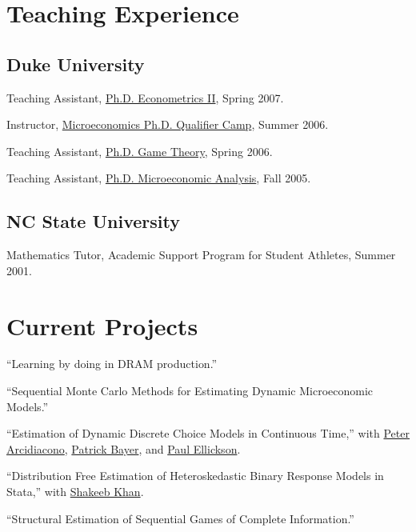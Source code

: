 \documentclass[letterpaper]{article}
\renewenvironment{itemize}{
  \begin{list}{}
    { \setlength{\itemsep}{5pt}
      \setlength{\parsep}{0pt}
      \setlength{\topsep}{0pt}
      \setlength{\leftmargin}{0em} } }{
  \end{list}}
\begin{document}
\section*{Teaching Experience}

\subsection*{Duke University}

\begin{itemize}
\item Teaching Assistant,
  \href{http://jblevins.org/courses/econ342s07}{Ph.D. Econometrics II},
  Spring 2007.
\item Instructor,
  \href{http://jblevins.org/courses/qualcamp06}{Microeconomics Ph.D. Qualifier Camp},
  Summer 2006.
\item Teaching Assistant,
  \href{http://jblevins.org/courses/econ302s06}{Ph.D. Game Theory},
  Spring 2006.
\item Teaching Assistant,
  \href{http://jblevins.org/courses/econ301f05}{Ph.D. Microeconomic Analysis},
  Fall 2005.
\end{itemize}

\subsection*{NC State University}

\begin{itemize}
\item Mathematics Tutor, Academic Support Program for Student Athletes,
  Summer 2001.
\end{itemize}


\section*{Current Projects}

\begin{itemize}
\item ``Learning by doing in DRAM production.''
\item ``Sequential Monte Carlo Methods for Estimating Dynamic
  Microeconomic Models.''
\item ``Estimation of Dynamic Discrete Choice Models in Continuous
  Time,'' with
  \href{http://www.econ.duke.edu/~psarcidi/}{Peter Arcidiacono},
  \href{http://www.econ.duke.edu/~pb29/}{Patrick Bayer}, and
  \href{http://www.econ.duke.edu/~paule/}{Paul Ellickson}.
\item ``Distribution Free Estimation of Heteroskedastic Binary Response
  Models in Stata,'' with
  \href{http://www.econ.duke.edu/~shakeebk/}{Shakeeb Khan}.
\item ``Structural Estimation of Sequential Games of Complete
  Information.''
\end{itemize}
\end{document}
